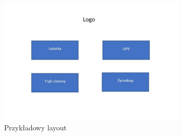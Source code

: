  \begin{figure}[!hbt]
 	\begin{center}
 		\includegraphics[angle=360, width=0.80\textwidth]{rys/Layout_1.jpg}
 		\caption{Przykładowy layout}
 		\label{rys:Layout}
 	\end{center}
 \end{figure}


  


 
 
 
 
 